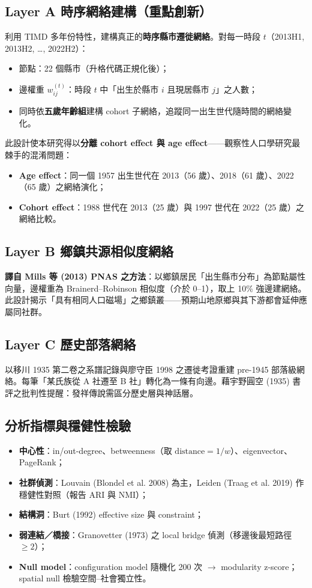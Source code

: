 \documentclass[11pt,a4paper]{article}
\begin{document}
\subsection{Layer A 時序網絡建構（重點創新）}
利用 TIMD 多年份特性，建構真正的\textbf{時序縣市遷徙網絡}。對每一時段 $t$（2013H1, 2013H2, \ldots, 2022H2）：
\begin{itemize}
\item 節點：22 個縣市（升格代碼正規化後）；
\item 邊權重 $w_{ij}^{(t)}$：時段 $t$ 中「出生於縣市 $i$ 且現居縣市 $j$」之人數；
\item 同時依\textbf{五歲年齡組}建構 cohort 子網絡，追蹤同一出生世代隨時間的網絡變化。
\end{itemize}

此設計使本研究得以\textbf{分離 cohort effect 與 age effect}——觀察性人口學研究最棘手的混淆問題：
\begin{itemize}
\item \textbf{Age effect}：同一個 1957 出生世代在 2013（56 歲）、2018（61 歲）、2022（65 歲）之網絡演化；
\item \textbf{Cohort effect}：1988 世代在 2013（25 歲）與 1997 世代在 2022（25 歲）之網絡比較。
\end{itemize}

\subsection{Layer B 鄉鎮共源相似度網絡}
\textbf{譯自 Mills 等 (2013) PNAS 之方法}：以鄉鎮居民「出生縣市分布」為節點屬性向量，邊權重為 Brainerd--Robinson 相似度（介於 0--1），取上 10\% 強邊建網絡。此設計揭示「具有相同人口磁場」之鄉鎮叢——預期山地原鄉與其下游都會延伸應屬同社群。

\subsection{Layer C 歷史部落網絡}
以移川 1935 第二卷之系譜記錄與廖守臣 1998 之遷徙考證重建 pre-1945 部落級網絡。每筆「某氏族從 A 社遷至 B 社」轉化為一條有向邊。藉宇野圓空 (1935) 書評之批判性提醒：發祥傳說需區分歷史層與神話層。

\subsection{分析指標與穩健性檢驗}
\begin{itemize}
\item \textbf{中心性}：in/out-degree、betweenness（取 $\text{distance}=1/w$）、eigenvector、PageRank；
\item \textbf{社群偵測}：Louvain (Blondel et al. 2008) 為主，Leiden (Traag et al. 2019) 作穩健性對照（報告 ARI 與 NMI）；
\item \textbf{結構洞}：Burt (1992) effective size 與 constraint；
\item \textbf{弱連結／橋接}：Granovetter (1973) 之 local bridge 偵測（移邊後最短路徑 $\geq 2$）；
\item \textbf{Null model}：configuration model 隨機化 200 次 $\rightarrow$ modularity z-score；spatial null 檢驗空間--社會獨立性。
\end{itemize}
\end{document}
